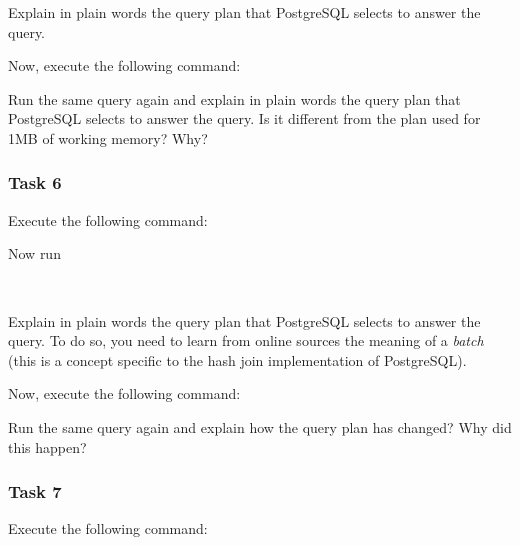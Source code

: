 \vgap

\noindent Explain in plain words the query plan that PostgreSQL selects to answer the query.

\vgap

\noindent Now, execute the following command:

\vgap

\noindent {}

\vgap

\noindent Run the same query again and explain in plain words the query plan that PostgreSQL selects to answer the query. Is it different from the plan used for 1MB of working memory? Why?

\subsubsection{Task 6}

Execute the following command:

\vgap

\noindent {}

\vgap

\noindent Now run

\vgap

\noindent {} \\
\noindent {}

\vgap

\noindent Explain in plain words the query plan that PostgreSQL selects to answer the query. To do so, you need to learn from online sources the meaning of a {\em batch} (this is a concept specific to the hash join implementation of PostgreSQL).

\vgap

\noindent Now, execute the following command:

\vgap

\noindent {}

\vgap

\noindent Run the same query again and explain how the query plan has changed? Why did this happen?

\subsubsection{Task 7}

Execute the following command:

\vgap

